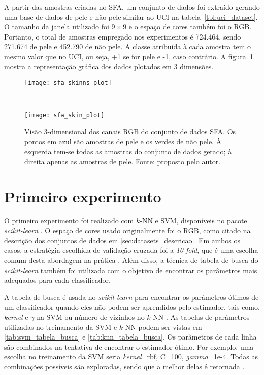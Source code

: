 A partir das amostras criadas no SFA, um conjunto de dados foi extraído gerando uma base de dados de pele e não pele similar ao UCI na tabela~\ref{tbl:uci_dataset}. O tamanho da janela utilizado foi $9 \times 9$ e o espaço de cores também foi o RGB. Portanto, o total de amostras empregado nos experimentos é 724.464, sendo 271.674 de pele e 452.790 de não pele. A classe atribuída à cada amostra tem o mesmo valor que no UCI, ou seja, +1 se for pele e -1, caso contrário. A figura~\ref{fig:dataset_sfa} mostra a representação gráfica dos dados plotados em 3 dimensões.
\begin{figure}[h]
    \centering
    \begin{minipage}{0.45\textwidth}
        \texttt{[image: sfa\_skinns\_plot]}
    \end{minipage}
    ~ %
    \begin{minipage}{0.45\textwidth}
        \texttt{[image: sfa\_skin\_plot]}
    \end{minipage}
    \caption[Visão 3-dimensional dos canais RGB do conjunto de dados SFA]{Visão 3-dimensional dos canais RGB do conjunto de dados SFA. Os pontos em azul são amostras de pele e os verdes de não pele. À esquerda tem-se todas as amostras do conjunto de dados gerado; à direita apenas as amostras de pele. Fonte: proposto pelo autor.}
    \label{fig:dataset_sfa}
\end{figure}

\section{Primeiro experimento}
O primeiro experimento foi realizado com $k$-NN e SVM, disponíveis no pacote \emph{scikit-learn} \citep{scikit-learn:11}. O espaço de cores usado originalmente foi o RGB, como citado na descrição dos conjuntos de dados em \ref{sec:datasets_descricao}. Em ambos os casos, a estratégia escolhida de validação cruzada foi a \emph{10-fold}, que é uma escolha comum desta abordagem na prática \citep{mostafa:12}. Além disso, a técnica de tabela de busca do \emph{scikit-learn} também foi utilizada com o objetivo de encontrar os parâmetros mais adequados para cada classificador.

A tabela de busca é usada no \emph{scikit-learn} para encontrar os parâmetros ótimos de um classificador quando eles não podem ser aprendidos pelo estimador, tais como, \emph{kernel} e $\gamma$ na SVM ou número de vizinhos no $k$-NN \citep{scikit-learn:11}. As tabelas de parâmetros utilizadas no treinamento da SVM e $k$-NN podem ser vistas em \ref{tab:svm_tabela_busca} e \ref{tab:knn_tabela_busca}. Os parâmetros de cada linha são combinados na tentativa de encontrar o estimador ótimo. Por exemplo, uma escolha no treinamento da SVM seria \emph{kernel}=rbf, C=100, \emph{gamma}=1e-4. Todas as combinações possíveis são exploradas, sendo que a melhor delas é retornada \citep{scikit-learn:11}.

